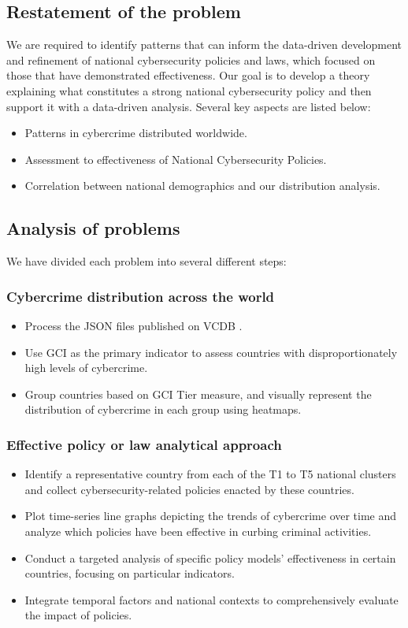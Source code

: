 \subsection{Restatement of the problem}\label{subsec:restatement-of-the-problem} %
	We are required to identify patterns
	that can inform the data-driven development and refinement of national cybersecurity policies and laws,
	which focused on those that have demonstrated effectiveness.
	Our goal is to develop a theory explaining what constitutes a strong national cybersecurity policy and then
	support it with a data-driven analysis.
	Several key aspects are listed below:
	\begin{itemize}
		\item Patterns in cybercrime distributed worldwide.
		\item Assessment to effectiveness of National Cybersecurity Policies.
		\item Correlation between national demographics and our distribution analysis.
	\end{itemize}
\subsection{Analysis of problems}\label{subsec:analysis-of-problems} %
	We have divided each problem into several different steps:
	\subsubsection{Cybercrime distribution across the world} %
		\begin{itemize}
			\item Process the JSON files published on VCDB .
			\item Use GCI as the primary indicator to assess countries with disproportionately high levels of cybercrime.
			\item Group countries based on GCI Tier measure, and
				visually represent the distribution of cybercrime in each group using heatmaps.
		\end{itemize}
	\subsubsection{Effective policy or law analytical approach} %
		\begin{itemize}
			\item Identify a representative country from each of the T1 to T5 national clusters and
				collect cybersecurity-related policies enacted by these countries.
			\item Plot time-series line graphs depicting the trends of cybercrime over time and
				analyze which policies have been effective in curbing criminal activities.
			\item Conduct a targeted analysis of specific policy models' effectiveness in certain countries,
				focusing on particular indicators.
			\item Integrate temporal factors and national contexts to comprehensively evaluate the impact of policies.
		\end{itemize}
